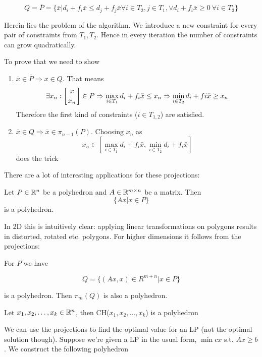 \[Q = \overline P = \{\bar x | d_i+f_i\bar x \leq d_j+f_j\bar x \forall i\in T_2,j\in T_1, \vee d_i+f_i\bar x \geq 0\ \forall i\in T_3\}\]

Herein lies the problem of the algorithm. We introduce a new constraint for every pair of constraints from $T_1,T_2$. Hence in every iteration the number of constraints can grow quadratically.

\begin{pr} To prove that we need to show
\begin{enumerate}
\item $\bar x \in \bar P \Rightarrow x\in Q$. That means 
\[\exists x_n: \left[{\bar x}\atop{x_n}\right] \in P \Rightarrow \max_{i\in T_1} d_i +f_i \bar x \leq x_n \Rightarrow \min_{i\in T_2} d_i+fi\bar x \geq x_n\]
Therefore the first kind of constraints ($i \in T_{1,2}$) are satisfied.
\item $\bar x \in Q \Rightarrow \bar x \in \pi_{n-1}(P)$. Choosing $x_n$ as 
\[x_n \in [\max_{i\in T_1} d_i+f_i \bar x, \min_{i\in T_2} d_i+f_i \bar x]\]
does the trick
\end{enumerate}
\end{pr}

There are a lot of interesting applications for these projections:

\begin{thm} Let $P\in \mathbb{R}^n$ be a polyhedron and $A\in \mathbb{R}^{m\times n}$ be a matrix. Then 
\[\{Ax|x\in P\}\]
is a polyhedron.
\end{thm}

In 2D this is intuitively clear: applying linear transformations on polygons results in distorted, rotated etc. polygons. For higher dimensions it follows from the projections:

\begin{pr} For $P$ we have

\[Q=\{(Ax,x)\in R^{m+n}| x\in P\}\]

is a polyhedron. Then $\pi_m(Q)$ is also a polyhedron.
\end{pr}

\begin{cor} Let $x_1,x_2,\ldots, x_k \in \mathbb{R}^n$, then CH($x_1,x_2,\ldots, x_k$) is a polyhedron\end{cor}

We can use the projections to find the optimal value for an LP (not the optimal solution though). Suppose we're given a LP in the usual form, $\min cx$ s.t. $Ax\geq b$. We construct the following polyhedron

